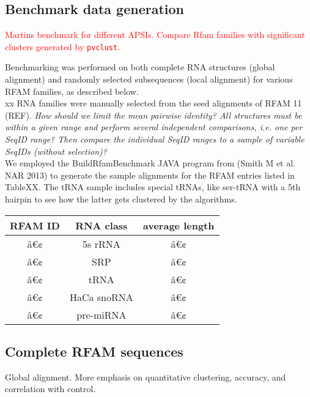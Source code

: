 \documentclass[a4paper,twoside]{article}
\newcommand\pvclust{\texttt{pvclust}}
\newcommand{\RED}[1]{\textcolor{red}{#1}}
\begin{document}
\subsection{Benchmark data generation} 

\RED{Martins benchmark for different APSIs. Compare Rfam families with
significant clusters generated by \pvclust.}

Benchmarking was performed on both complete RNA structures (global alignment)
and randomly selected subsequences (local alignment) for various RFAM families,
as described below. \\

xx RNA families were manually selected from the seed alignments of RFAM 11
(REF). \textit{How should we limit the mean pairwise identity? All structures
must be within a given range and perform several independent comparisons, i.e.
one per SeqID range? Then compare the individual SeqID ranges to a sample of
variable SeqIDs (without selection)?}\\

We employed the BuildRfamBenchmark JAVA program from (Smith M et al. NAR 2013)
to generate the sample alignments for the RFAM entries listed in TableXX. The
tRNA sample includes special tRNAs, like ser-tRNA with a 5th hairpin to see how
the latter gets clustered by the algorithms. \\

\begin{tabular}{|c|c|c|}
\hline 
\textbf{RFAM ID} & \textbf{RNA class} & \textbf{average length} \\ 
\hline 
â€¢ & 5s rRNA & â€¢ \\ 
â€¢ & SRP & â€¢ \\ 
â€¢ & tRNA & â€¢ \\ 
â€¢ & HaCa snoRNA & â€¢ \\ 
â€¢ & pre-miRNA & â€¢ \\ 
\hline 
\end{tabular} 


\subsection{Complete RFAM sequences}

Global alignment. More emphasis on quantitative clustering, accuracy, and
correlation with control. 
\end{document}
